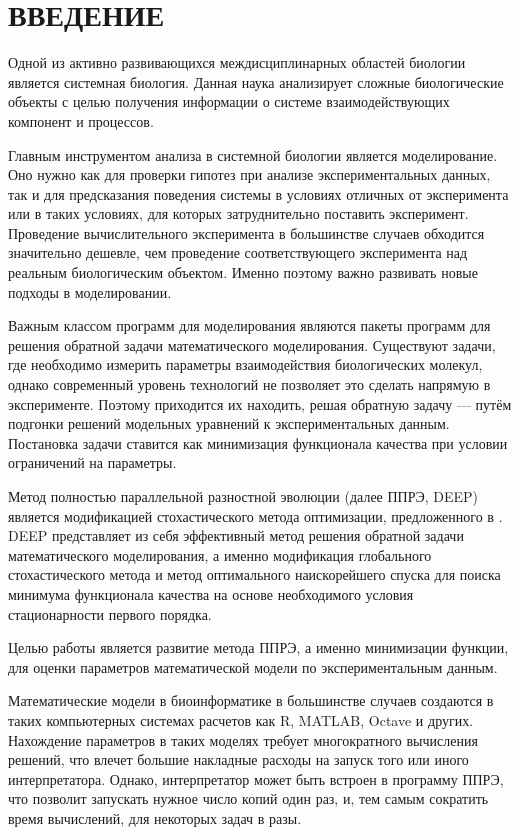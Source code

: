 \chapter*{ВВЕДЕНИЕ}

Одной из активно развивающихся междисциплинарных областей биологии является системная биология. 
Данная наука анализирует сложные биологические объекты с целью получения информации о системе взаимодействующих компонент и процессов.

Главным инструментом анализа в системной биологии является моделирование.
Оно нужно как для проверки гипотез при анализе экспериментальных данных, так и для предсказания поведения системы в условиях отличных от эксперимента или в таких условиях, для которых затруднительно поставить эксперимент.
Проведение вычислительного эксперимента в большинстве случаев обходится значительно дешевле, чем проведение соответствующего эксперимента над реальным биологическим объектом.
Именно поэтому важно развивать новые подходы в моделировании.

Важным классом программ для моделирования являются пакеты программ для решения обратной задачи математического моделирования.
Существуют задачи, где необходимо измерить параметры взаимодействия биологических молекул, однако современный уровень технологий не позволяет это сделать напрямую в эксперименте.
Поэтому приходится их находить, решая обратную задачу --- путём подгонки решений модельных уравнений к экспериментальных данным.
Постановка задачи ставится как минимизация функционала качества при условии ограничений на параметры.

Метод полностью параллельной разностной эволюции (далее ППРЭ, DEEP) \cite{Kozlov11, Kozlov13} является модификацией стохастического метода оптимизации, предложенного в \cite{Storn95}.
DEEP представляет из себя эффективный метод решения обратной задачи математического моделирования, а именно модификация глобального стохастического метода и метод оптимального наискорейшего спуска для поиска минимума функционала качества на основе необходимого условия стационарности первого порядка.

Целью работы является развитие метода ППРЭ, а именно минимизации функции, для оценки параметров математической модели по экспериментальным данным.

Математические модели в биоинформатике в большинстве случаев создаются в таких компьютерных системах расчетов как R, MATLAB, Octave и других.
Нахождение параметров в таких моделях требует многократного вычисления решений, что влечет большие накладные расходы на запуск того или иного интерпретатора.
Однако, интерпретатор может быть встроен в программу ППРЭ, что позволит запускать нужное число копий один раз, и, тем самым сократить время вычислений, для некоторых задач в разы.

